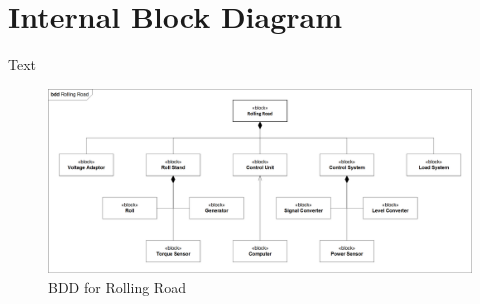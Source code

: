 \section{Internal Block Diagram}
Text

\begin{figure}[H]
	\centering
	\includegraphics[width=1\linewidth]{Architecture/Diagrams/BDD_RR}
	\caption{BDD for Rolling Road}
	\label{fig:RR_BDD}
\end{figure}